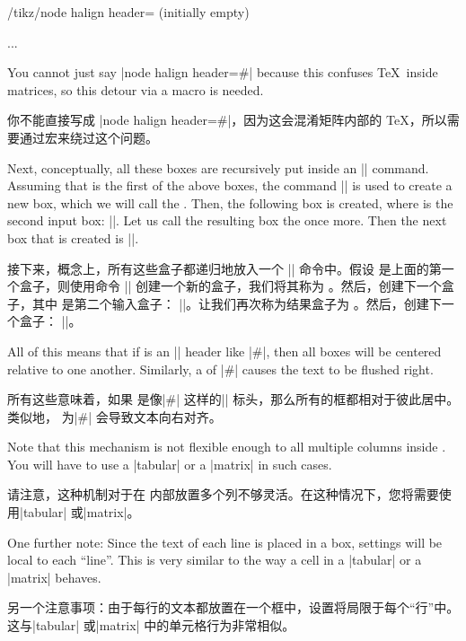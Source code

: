 \begin{key}{/tikz/node halign header= (initially \normalfont empty)}
\begin{codeexample}
\def\myheader{\hfil\hfil##\hfil\cr}
\tikz [node halign header=\myheader] ...
\end{codeexample}
    You cannot just say |node halign header=\hfil\hfil#\hfil\cr| because this
    confuses \TeX\ inside matrices, so this detour via a macro is needed.

    你不能直接写成 |node halign header=\hfil\hfil#\hfil\cr|，因为这会混淆矩阵内部的 \TeX，所以需要通过宏来绕过这个问题。


    Next, conceptually, all these boxes are recursively put inside an |\halign|
    command. Assuming that  is the first of the above boxes, the
    command || is used to create
    a new box, which we will call the . Then, the following
    box is created, where  is the second input box:
    ||. Let us call the resulting box the  once more. Then the next box that is created is
    ||.

    接下来，概念上，所有这些盒子都递归地放入一个 |\halign| 命令中。假设  是上面的第一个盒子，则使用命令 || 创建一个新的盒子，我们将其称为 。然后，创建下一个盒子，其中  是第二个输入盒子：
    ||。让我们再次称为结果盒子为 。然后，创建下一个盒子：
||。




    All of this means that if  is an |\halign| header like
    |\hfil#\hfil\cr|, then all boxes will be centered relative to one another.
    Similarly, a  of |\hfil#\cr| causes the text to be flushed
    right.

    所有这些意味着，如果 是像|\hfil#\hfil\cr| 这样的|\halign| 标头，那么所有的框都相对于彼此居中。类似地， 为|\hfil#\cr| 会导致文本向右对齐。



    Note that this mechanism is not flexible enough to all multiple columns
    inside . You will have to use a |tabular| or a |matrix| in
    such cases.

    请注意，这种机制对于在 内部放置多个列不够灵活。在这种情况下，您将需要使用|tabular| 或|matrix|。

    One further note: Since the text of each line is placed in a box, settings
    will be local to each ``line''. This is very similar to the way a cell in a
    |tabular| or a |matrix| behaves.

    另一个注意事项：由于每行的文本都放置在一个框中，设置将局限于每个“行”中。这与|tabular| 或|matrix| 中的单元格行为非常相似。

  \end{key}


